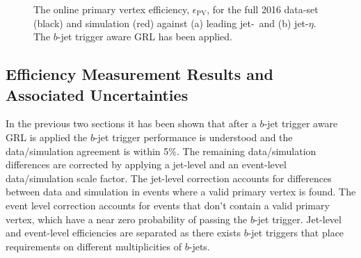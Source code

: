 \begin{figure}[!ht]
  \begin{center}
    \captionsetup[subfigure]{aboveskip=0pt,justification=centering}
  \end{center}
\vspace{-1em}
\caption[
  The online primary vertex efficiency for the full 2016 data-set and for simulation.
  The $b$-jet trigger aware GRL has been applied.
]
        {
  The online primary vertex efficiency, $\epsilon_{\text{PV}}$, for the full 2016 data-set (black) and simulation (red) against (a) leading jet-\pT~and (b) jet-$\eta$.
  The $b$-jet trigger aware GRL has been applied.}
  \label{fig:Full_bslt2mm_bperf}
\end{figure}

\subsection{Efficiency Measurement Results and Associated Uncertainties}
\label{sec:trig-eff_syst}

In the previous two sections it has been shown that after a $b$-jet trigger aware GRL is applied
the $b$-jet trigger performance is understood and the data/simulation agreement is within 5\%.
The remaining data/simulation differences are corrected by applying a jet-level and an event-level data/simulation scale factor.
The jet-level correction accounts for differences between data and simulation in events where a valid primary vertex is found.
The event level correction accounts for events that don't contain a valid primary vertex, which have a near zero probability of passing the $b$-jet trigger.
Jet-level and event-level efficiencies are separated as there exists $b$-jet triggers that place requirements on different multiplicities of $b$-jets.

